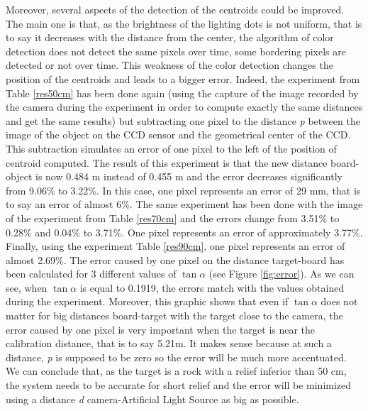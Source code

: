 Moreover, several aspects of the detection of the centroids could be improved. The main one is that, as the brightness of the lighting dots is not uniform, that is to say it decreases with the distance from the center, the algorithm of color detection does not detect the same pixels over time, some bordering pixels are detected or not over time. This weakness of the color detection changes the position of the centroids and leads to a bigger error. Indeed, the experiment from Table \ref{res50cm} has been done again (using the capture of the image recorded by the camera during the experiment in order to compute exactly the same distances and get the same results) but subtracting one pixel to the distance \emph{p} between the image of the object on the CCD sensor and the geometrical center of the CCD. This subtraction simulates an error of one pixel to the left of the position of centroid computed. The result of this experiment is that the new distance board-object is now 0.484 m instead of 0.455 m and the error decreases significantly from 9.06\% to 3.22\%. In this case, one pixel represents an error of 29 mm, that is to say an error of almost 6\%. The same experiment has been done with the image of the experiment from Table \ref{res70cm} and the errors change from 3.51\% to 0.28\% and 0.04\% to 3.71\%. One pixel represents an error of approximately 3.77\%. Finally, using the experiment Table \ref{res90cm}, one pixel represents an error of almost 2.69\%. The error caused by one pixel on the distance target-board has been calculated for 3 different values of $\tan \alpha$ (see Figure \ref{fig:error}). As we can see, when $\tan \alpha$ is equal to 0.1919, the errors match with the values obtained during the experiment. Moreover, this graphic shows that even if $\tan \alpha$ does not matter for big distances board-target with the target close to the camera, the error caused by one pixel is very important when the target is near the calibration distance, that is to say 5.21m. It makes sense because at such a distance, \emph{p} is supposed to be zero so the error will be much more accentuated. We can conclude that, as the target is a rock with a relief inferior than 50 cm, the system needs to be accurate for short relief and the error will be minimized using a distance \emph{d} camera-Artificial Light Source as big as possible.


